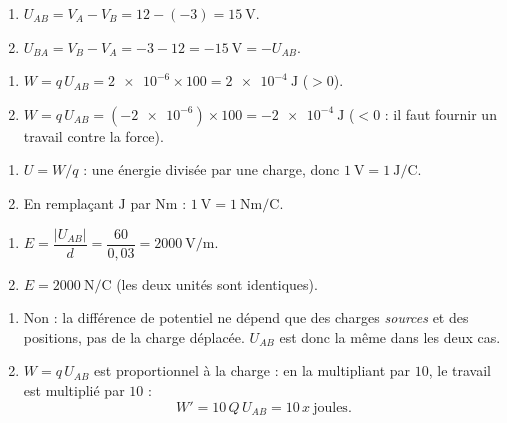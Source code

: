 \documentclass[11pt,a4paper]{article}
\begin{document}

\begin{corrige}
\begin{enumerate}[label=\alph*)]
  \item $U_{AB} = V_A - V_B = 12 - (-3) = \SI{15}{\volt}$.
  \item $U_{BA} = V_B - V_A = -3 - 12 = \SI{-15}{\volt} = -U_{AB}$.
\end{enumerate}
\end{corrige}

\begin{corrige}
\begin{enumerate}[label=\alph*)]
  \item $W = q\,U_{AB} = \num{2e-6}\times 100 = \SI{2e-4}{\joule}$ ($>0$).
  \item $W = q\,U_{AB} = (\num{-2e-6})\times 100 = \SI{-2e-4}{\joule}$ ($<0$ : il faut fournir un
        travail contre la force).
\end{enumerate}
\end{corrige}

\begin{corrige}
\begin{enumerate}[label=\alph*)]
  \item $U = W/q$ : une énergie divisée par une charge, donc $\SI{1}{\volt} = \SI{1}{\joule\per\coulomb}$.
  \item En remplaçant $\si{\joule}$ par $\si{\newton\metre}$ :
        $\SI{1}{\volt} = \SI{1}{\newton\metre\per\coulomb}$.
\end{enumerate}
\end{corrige}

\begin{corrige}
\begin{enumerate}[label=\alph*)]
  \item $E = \dfrac{|U_{AB}|}{d} = \dfrac{60}{0{,}03} = \SI{2000}{\volt\per\metre}$.
  \item $E = \SI{2000}{\newton\per\coulomb}$ (les deux unités sont identiques).
\end{enumerate}
\end{corrige}

\begin{corrige}
\begin{enumerate}[label=\alph*)]
  \item Non : la différence de potentiel ne dépend que des charges \emph{sources} et des positions,
        pas de la charge déplacée. $U_{AB}$ est donc la même dans les deux cas.
  \item $W = q\,U_{AB}$ est proportionnel à la charge : en la multipliant par $10$, le travail est
        multiplié par $10$ :
        \[ W' = 10\,Q\,U_{AB} = 10\,x\ \text{joules}. \]
\end{enumerate}
\end{corrige}
\end{document}

